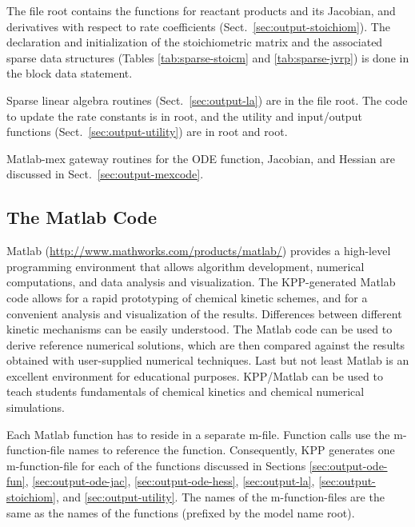 \documentclass[twoside]{article}
\newcommand{\kpproot}{{\sc root}}
\begin{document}
The file \kpproot{} contains the functions for reactant
products and its Jacobian, and derivatives with respect to rate
coefficients (Sect.~\ref{sec:output-stoichiom}). The declaration and
initialization of the stoichiometric matrix and the associated sparse
data structures (Tables \ref{tab:sparse-stoicm} and
\ref{tab:sparse-jvrp}) is done in the  block data
statement.

Sparse linear algebra routines (Sect.~\ref{sec:output-la}) are in
the file \kpproot{}. The code to update the rate
constants is in \kpproot{}, and the utility and
input/output functions (Sect.~\ref{sec:output-utility}) are in
\kpproot{} and \kpproot{}.

Matlab-mex gateway routines for the ODE function, Jacobian, and
Hessian are discussed in Sect.~\ref{sec:output-mexcode}.

\subsection{The Matlab Code}
\label{sec:matlab}

Matlab (\url{http://www.mathworks.com/products/matlab/}) provides a
high-level programming environment that allows algorithm development,
numerical computations, and data analysis and visualization. The
KPP-generated Matlab code allows for a rapid prototyping of chemical
kinetic schemes, and for a convenient analysis and visualization of the
results. Differences between different kinetic mechanisms can be easily
understood. The Matlab code can be used to derive reference numerical
solutions, which are then compared against the results obtained with
user-supplied numerical techniques. Last but not least Matlab is an
excellent environment for educational purposes. KPP/Matlab can be used
to teach students fundamentals of chemical kinetics and chemical
numerical simulations.

Each Matlab function has to reside in a separate m-file. Function calls
use the m-function-file names to reference the function. Consequently,
KPP generates one m-function-file for each of the functions discussed in
Sections \ref{sec:output-ode-fun}, \ref{sec:output-ode-jac},
\ref{sec:output-ode-hess}, \ref{sec:output-la},
\ref{sec:output-stoichiom}, and \ref{sec:output-utility}. The names of
the m-function-files are the same as the names of the functions
(prefixed by the model name \kpproot).
\end{document}
